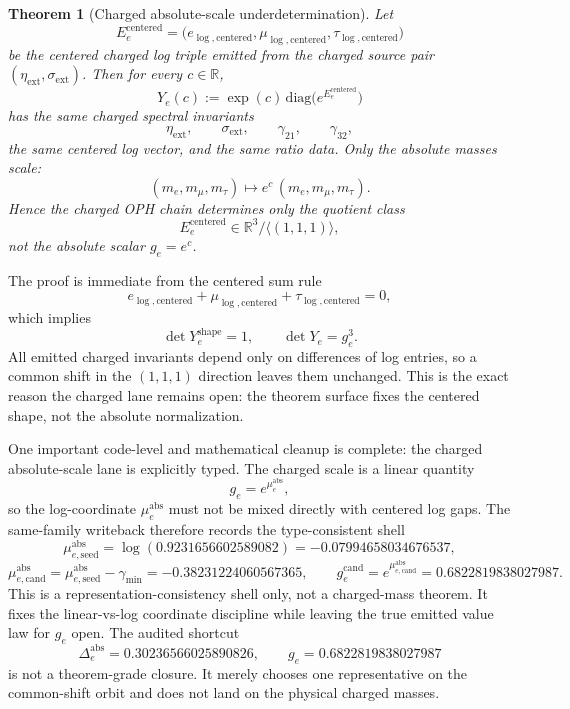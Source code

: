 \documentclass[11pt]{article}
\newtheorem{theorem}{Theorem}[section]
\begin{document}
\begin{theorem}[Charged absolute-scale underdetermination]
Let
\[
E_e^{\mathrm{centered}}
=
\bigl(e_{\log,\mathrm{centered}},\mu_{\log,\mathrm{centered}},\tau_{\log,\mathrm{centered}}\bigr)
\]
be the centered charged log triple emitted from the charged source pair
\((\eta_{\mathrm{ext}},\sigma_{\mathrm{ext}})\). Then for every \(c\in\mathbb R\),
\[
Y_e(c):=\exp(c)\,\mathrm{diag}\!\bigl(e^{E_e^{\mathrm{centered}}}\bigr)
\]
has the same charged spectral invariants
\[
\eta_{\mathrm{ext}},\qquad \sigma_{\mathrm{ext}},\qquad \gamma_{21},\qquad \gamma_{32},
\]
the same centered log vector, and the same ratio data. Only the absolute masses scale:
\[
(m_e,m_\mu,m_\tau)\longmapsto e^c\,(m_e,m_\mu,m_\tau).
\]
Hence the charged OPH chain determines only the quotient class
\[
E_e^{\mathrm{centered}}\in \mathbb R^3/\langle(1,1,1)\rangle,
\]
not the absolute scalar \(g_e=e^c\).
\end{theorem}

The proof is immediate from the centered sum rule
\[
e_{\log,\mathrm{centered}}+\mu_{\log,\mathrm{centered}}+\tau_{\log,\mathrm{centered}}=0,
\]
which implies
\[
\det Y_e^{\mathrm{shape}}=1,
\qquad
\det Y_e = g_e^3.
\]
All emitted charged invariants depend only on differences of log entries, so a common shift in the
\((1,1,1)\) direction leaves them unchanged. This is the exact reason the charged lane remains open:
the theorem surface fixes the centered shape, not the absolute normalization.

One important code-level and mathematical cleanup is complete: the charged absolute-scale
lane is explicitly typed. The charged scale is a linear quantity
\[
g_e = e^{\mu_e^{\mathrm{abs}}},
\]
so the log-coordinate \(\mu_e^{\mathrm{abs}}\) must not be mixed directly with centered log gaps.
The same-family writeback therefore records the type-consistent shell
\[
\mu_{e,\mathrm{seed}}^{\mathrm{abs}} = \log(0.9231656602589082) = -0.07994658034676537,
\]
\[
\mu_{e,\mathrm{cand}}^{\mathrm{abs}}
=
\mu_{e,\mathrm{seed}}^{\mathrm{abs}}-\gamma_{\min}
=
-0.38231224060567365,
\qquad
g_e^{\mathrm{cand}} = e^{\mu_{e,\mathrm{cand}}^{\mathrm{abs}}}=0.6822819838027987.
\]
This is a representation-consistency shell only, not a charged-mass theorem. It fixes the
linear-vs-log coordinate discipline while leaving the true emitted value law for \(g_e\) open.
The audited shortcut
\[
\Delta_e^{\mathrm{abs}}=0.30236566025890826,
\qquad
g_e=0.6822819838027987
\]
is not a theorem-grade closure. It merely chooses one representative on the common-shift orbit and
does not land on the physical charged masses.
\end{document}
